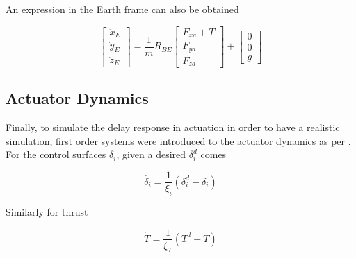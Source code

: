 An expression in the Earth frame can also be obtained

\begin{equation}
\begin{bmatrix}
\ddot{x}_E\\
\ddot{y}_E\\
\ddot{z}_E
\end{bmatrix}
= \dfrac{1}{m} R_{BE}
\begin{bmatrix}
F_{xa}+T\\
F_{ya}\\
F_{za}
\end{bmatrix}
+
\begin{bmatrix}
0\\
0\\
g
\end{bmatrix}
\end{equation}

\subsection{Actuator Dynamics}
\label{section:background/model/actuator_dynamics}

Finally, to simulate the delay response in actuation in order to have a realistic simulation, first order systems were introduced to the actuator dynamics as per \cite{hector}. For the control surfaces $\delta_i$, given a desired $\delta_i^d$ comes

\begin{equation}
\dot{\delta_i} = \dfrac{1}{\xi_i}(\delta_i^d-\delta_i)
\label{eq:actuator_dynamics}
\end{equation}

Similarly for thrust

\begin{equation}
\dot{T} = \dfrac{1}{\xi_T}(T^d-T)
\end{equation}

